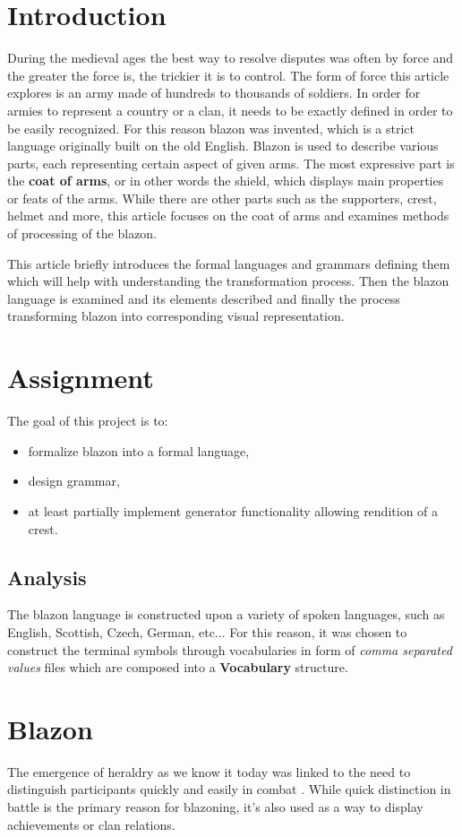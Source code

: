 \documentclass[12pt,a4paper]{article}
\let\oldsection\section
\renewcommand\section{\clearpage\oldsection}
\begin{document}
\section{Introduction}
During the medieval ages the best way to resolve disputes was often by force and the greater the force is, the trickier it is to control. The form of force this article explores is an army made of hundreds to thousands of soldiers. In order for armies to represent a country or a clan, it needs to be exactly defined in order to be easily recognized. For this reason blazon was invented, which is a strict language originally built on the old English.
Blazon is used to describe various parts, each representing certain aspect of given arms. The most expressive part is the \textbf{coat of arms}, or in other words the shield, which displays main properties or feats of the arms.
While there are other parts such as the supporters, crest, helmet and more, this article focuses on the coat of arms and examines methods of processing of the blazon.

This article briefly introduces the formal languages and grammars defining them which will help with understanding the transformation process. Then the blazon language is examined and its elements described and finally the process transforming blazon into corresponding visual representation.

\section{Assignment}
The goal of this project is to:
\begin{itemize}
\item formalize blazon into a formal language,
\item design grammar,
\item at least partially implement generator functionality allowing rendition of a crest.
\end{itemize}

\subsection{Analysis}
The blazon language is constructed upon a variety of spoken languages, such as English, Scottish, Czech, German, etc...
For this reason, it was chosen to construct the terminal symbols through vocabularies in form of \textit{comma separated values} files which are composed into a \textbf{Vocabulary} structure.

\section{Blazon}
The emergence of heraldry as we know it today was linked to the need to distinguish participants quickly and easily in combat \cite{InternationalHeraldry}.
While quick distinction in battle is the primary reason for blazoning, it's also used as a way to display achievements or clan relations.
\end{document}

